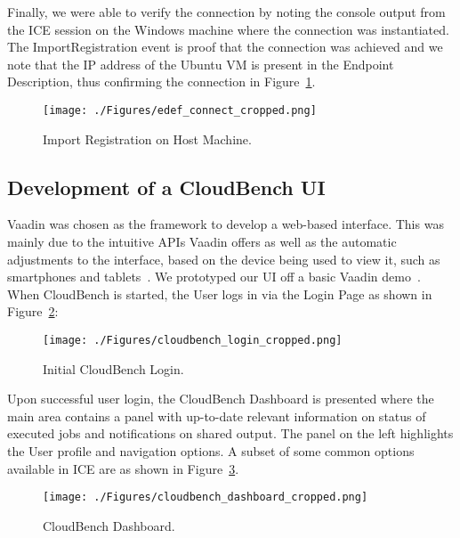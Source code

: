 Finally, we were able to verify the connection by noting the console output 
from the ICE session on the Windows machine where the connection was 
instantiated. The ImportRegistration event is proof that the connection was 
achieved and we note that the IP address of the Ubuntu VM is present in the 
Endpoint Description, thus confirming the connection in 
Figure~\ref{fig:edef_connect}.

\begin{figure}[thb]
\begin{center}
\leavevmode
\texttt{[image: ./Figures/edef\_connect\_cropped.png]}
\end{center}
\caption{Import Registration on Host Machine.}
\label{fig:edef_connect}
\end{figure}


\subsection{Development of a CloudBench UI}
\label{sec:cloudbench_ui_dev}
Vaadin was chosen as the framework to develop a web-based interface. This was 
mainly due to the intuitive APIs Vaadin offers as well as the automatic 
adjustments to the interface, based on the device being used to view it, such 
as smartphones and tablets~\cite{vaadin}. We prototyped our UI off a basic 
Vaadin demo~\cite{vaadin_demo}. When CloudBench is started, the User logs in 
via the Login Page as shown in Figure~\ref{fig:cbench_login}:

\begin{figure}[!thb]
\begin{center}
\leavevmode
\texttt{[image: ./Figures/cloudbench\_login\_cropped.png]}
\end{center}
\caption{Initial CloudBench Login.}
\label{fig:cbench_login}
\end{figure}

Upon successful user login, the CloudBench Dashboard is presented where the 
main area contains a panel with up-to-date relevant information on status of 
executed jobs and notifications on shared output. The panel on the left 
highlights the User profile and navigation options. A subset of some common 
options available in ICE are as shown in Figure~\ref{fig:cbench_dashboard}.

\begin{figure}[!thb]
\begin{center}
\leavevmode
\texttt{[image: ./Figures/cloudbench\_dashboard\_cropped.png]}
\end{center}
\caption{CloudBench Dashboard.}
\label{fig:cbench_dashboard}
\end{figure}

